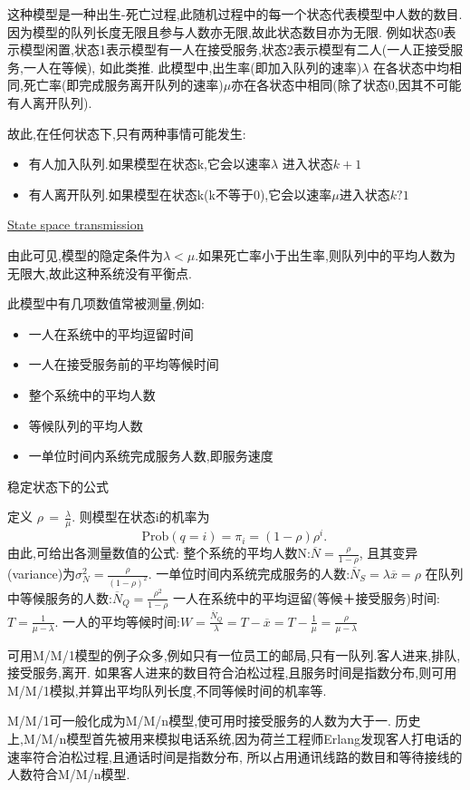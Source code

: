 这种模型是一种出生-死亡过程,此随机过程中的每一个状态代表模型中人数的数目.因为模型的队列长度无限且参与人数亦无限,故此状态数目亦为无限.
例如状态0表示模型闲置,状态1表示模型有一人在接受服务,状态2表示模型有二人(一人正接受服务,一人在等候),
如此类推. 此模型中,出生率(即加入队列的速率)$\lambda$ 在各状态中均相同,死亡率(即完成服务离开队列的速率)$\mu$亦在各状态中相同(除了状态0,因其不可能有人离开队列).

故此,在任何状态下,只有两种事情可能发生:
\begin{itemize}
\item 有人加入队列.如果模型在状态k,它会以速率$\lambda$ 进入状态$k + 1$
\item 有人离开队列.如果模型在状态k(k不等于0),它会以速率$\mu$进入状态$k ? 1$
\end{itemize}

\href{http://upload.wikimedia.org/wikipedia/commons/thumb/e/e6/MM1\_queue\_state\_space.svg/605px-MM1\_queue\_state\_space.svg.png}{State space transmission}

由此可见,模型的隐定条件为$\lambda < \mu$.如果死亡率小于出生率,则队列中的平均人数为无限大,故此这种系统没有平衡点.

此模型中有几项数值常被测量,例如:
\begin{itemize}
\item 一人在系统中的平均逗留时间
\item 一人在接受服务前的平均等候时间
\item 整个系统中的平均人数
\item 等候队列的平均人数
\item 一单位时间内系统完成服务人数,即服务速度
\end{itemize}

稳定状态下的公式

定义 $\scriptstyle \rho \,=\,{\tfrac  {\lambda }{\mu }}$.
则模型在状态i的机率为
$$ {\mbox{Prob}}(q=i)=\pi _{i}=(1-\rho )\rho ^{i}.\, $$
由此,可给出各测量数值的公式:
整个系统的平均人数N:$\overline N={\frac  {\rho }{1-\rho }}$,
且其变异(variance)为$\sigma _{N}^{2}={\frac  {\rho }{(1-\rho )^{2}}}$.
一单位时间内系统完成服务的人数:$\overline N_{S}=\lambda \overline x=\rho$
在队列中等候服务的人数:$\overline N_{Q}={\frac  {\rho ^{2}}{1-\rho }}$
一人在系统中的平均逗留(等候＋接受服务)时间:$T={\frac  {1}{\mu -\lambda }}$.
一人的平均等候时间:$W={\frac  {\overline N_{Q}}{\lambda }}=T-\overline x=T-{\frac  {1}{\mu }}={\frac  {\rho }{\mu -\lambda }}$

\begin{example}
可用M/M/1模型的例子众多,例如只有一位员工的邮局,只有一队列.客人进来,排队,接受服务,离开.
如果客人进来的数目符合泊松过程,且服务时间是指数分布,则可用M/M/1模拟,并算出平均队列长度,不同等候时间的机率等.

M/M/1可一般化成为M/M/n模型,使可用时接受服务的人数为大于一.
历史上,M/M/n模型首先被用来模拟电话系统,因为荷兰工程师Erlang发现客人打电话的速率符合泊松过程,且通话时间是指数分布,
所以占用通讯线路的数目和等待接线的人数符合M/M/n模型.
\end{example}

